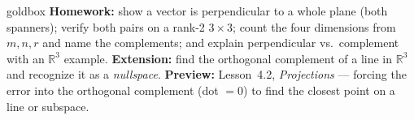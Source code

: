 \documentclass[10pt]{article}
\begin{document}
\begin{skillbox}{goldbox}
\textbf{Homework:} show a vector is perpendicular to a whole plane (both spanners); verify both pairs on
a rank-2 $3\times3$; count the four dimensions from $m,n,r$ and name the complements; and explain
perpendicular vs.\ complement with an $\mathbb{R}^3$ example. \textbf{Extension:} find the orthogonal
complement of a line in $\mathbb{R}^3$ and recognize it as a \emph{nullspace}. \textbf{Preview:}
Lesson~4.2, \emph{Projections} --- forcing the error into the orthogonal complement (dot $=0$) to find
the closest point on a line or subspace.
\end{skillbox}
\end{document}
